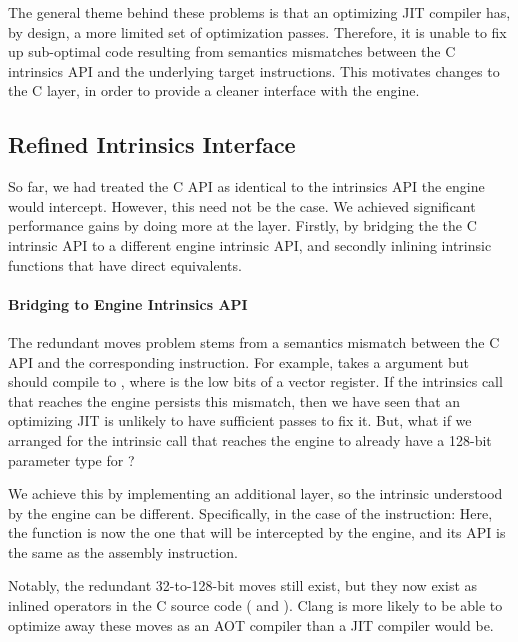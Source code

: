 The general theme behind these problems is that an optimizing JIT compiler has,
by design, a more limited set of optimization passes. Therefore, it is unable to
fix up sub-optimal code resulting from semantics mismatches between the C
intrinsics API and the underlying target instructions. This motivates changes to
the C layer, in order to provide a cleaner interface with the \wasm engine.

\subsection{Refined Intrinsics Interface}
\label{sec:refined}

So far, we had treated the C API as identical to the intrinsics API the engine
would intercept. However, this need not be the case. We achieved significant
performance gains by doing more at the  layer. Firstly, by
bridging the the C intrinsic API to a different engine intrinsic API, and
secondly inlining intrinsic functions that have direct \wasm equivalents.

\newcommand{\changeargmap}{Bridging to Engine Intrinsics API}
\paragraph{\changeargmap}

The redundant moves problem stems from a semantics mismatch between the C API
and the corresponding instruction.  For example,  takes a
 argument but should compile to ,
where  is the low bits of a vector register. If the intrinsics call
that reaches the \wasm engine persists this mismatch, then we have seen that an
optimizing JIT is unlikely to have sufficient passes to fix it. But, what if we
arranged for the intrinsic call that reaches the engine to already have a
128-bit parameter type for ?

We achieve this by implementing an additional layer, so the intrinsic understood
by the engine can be different. Specifically, in the case of the 
instruction:
%
%
Here, the  function is now the one that will be
intercepted by the engine, and its API is the same as the assembly instruction.

Notably, the redundant 32-to-128-bit moves still exist, but they now exist as
inlined \wasm operators in the C source code ( and
). Clang is more likely to be able to optimize away
these moves as an AOT compiler than a JIT compiler would be.

